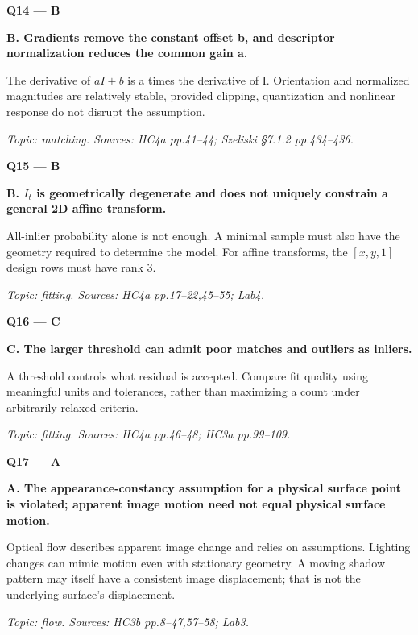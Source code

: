 \documentclass[11pt,a4paper]{article}
\begin{document}
\par\vspace{12pt}
\begin{minipage}{\linewidth}
\textbf{Q14 — B}\par\smallskip
\textbf{B. Gradients remove the constant offset b,\allowbreak{} and descriptor normalization reduces the common gain a.}\par
The derivative of \(aI+b\) is a times the derivative of I. Orientation and normalized magnitudes are relatively stable,\allowbreak{} provided clipping,\allowbreak{} quantization and nonlinear response do not disrupt the assumption.\par
{\small\itshape Topic: matching. Sources: HC4a pp.41–44; Szeliski §7.1.2 pp.434–436.}

\end{minipage}
\par\vspace{12pt}
\begin{minipage}{\linewidth}
\textbf{Q15 — B}\par\smallskip
\textbf{B. \(I_t\) is geometrically degenerate and does not uniquely constrain a general 2D affine transform.}\par
All-inlier probability alone is not enough. A minimal sample must also have the geometry required to determine the model. For affine transforms,\allowbreak{} the \([x,y,1]\) design rows must have rank 3.\par
{\small\itshape Topic: fitting. Sources: HC4a pp.17–22,\allowbreak{}45–55; Lab4.}

\end{minipage}
\par\vspace{12pt}
\begin{minipage}{\linewidth}
\textbf{Q16 — C}\par\smallskip
\textbf{C. The larger threshold can admit poor matches and outliers as inliers.}\par
A threshold controls what residual is accepted. Compare fit quality using meaningful units and tolerances,\allowbreak{} rather than maximizing a count under arbitrarily relaxed criteria.\par
{\small\itshape Topic: fitting. Sources: HC4a pp.46–48; HC3a pp.99–109.}

\end{minipage}
\par\vspace{12pt}
\begin{minipage}{\linewidth}
\textbf{Q17 — A}\par\smallskip
\textbf{A. The appearance-constancy assumption for a physical surface point is violated; apparent image motion need not equal physical surface motion.}\par
Optical flow describes apparent image change and relies on assumptions. Lighting changes can mimic motion even with stationary geometry. A moving shadow pattern may itself have a consistent image displacement; that is not the underlying surface's displacement.\par
{\small\itshape Topic: flow. Sources: HC3b pp.8–47,\allowbreak{}57–58; Lab3.}

\end{minipage}
\end{document}
